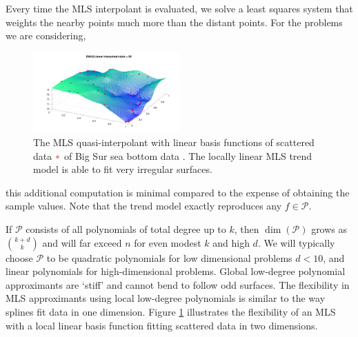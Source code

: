 \documentclass[11pt]{NSFamsart}
\newcommand{\calp}{{\mathcal{P}}}
\begin{document}
Every time the MLS interpolant is evaluated, we solve a least squares system that weights the nearby points much more than the distant points. For the problems we are considering,
\begin{figure}
\begin{center}
\includegraphics[width = 0.5\textwidth]{ProgramsImages/bigsurT.pdf}
\end{center}
\caption{The MLS quasi-interpolant with linear basis functions of scattered data {$\color{red}*$} of Big Sur sea bottom data \cite{franke1979critical}. The locally linear MLS trend model is able to fit very irregular surfaces.
\label{MLS}}
\end{figure}
this additional computation is minimal compared to the expense of obtaining the sample values. Note that the trend model exactly reproduces any $f \in \calp$.

If $\calp$ consists of all polynomials of total degree up to $k$,  then $\dim(\calp)$ grows as 
$\binom{k + d }{k}$ 
and will far exceed $n$ for even modest $k$ and high $d$. 
We will typically choose $\calp$ to be quadratic polynomials for low dimensional problems $d<10$, and linear polynomials for high-dimensional problems. 
Global low-degree polynomial approximants are `stiff' and cannot bend to follow odd surfaces. The flexibility in MLS approximants using local low-degree polynomials is similar to the way splines fit data in one dimension. 
Figure \ref{MLS} illustrates the flexibility of an MLS with a local linear basis function fitting scattered data in two dimensions. 


\end{document}
